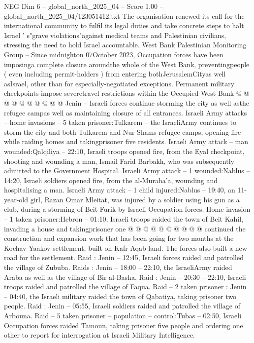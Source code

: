 \begin{textsample}{NEG Dim 6 – global\_north\_2025\_04 – Score 1.00 – global\_north\_2025\_04/123051412.txt}
The organisation renewed its call for the international community to fulfil its legal duties and take concrete steps to halt Israel ' s"grave violations"against medical teams and Palestinian civilians, stressing the need to hold Israel accountable.
West Bank Palestinian Monitoring Group -- Since midnighton 07October 2023, Occupation forces have been imposinga complete closure aroundthe whole of the West Bank, preventingpeople ( even including permit-holders ) from entering bothJerusalemCityas well asIsrael, other than for especially-negotiated exceptions.
Permanent military checkpoints impose severetravel restrictions within the Occupied West Bank @ @ @ @ @ @ @ @ @ @ Jenin -- Israeli forces continue storming the city as well asthe refugee campas well as maintaining closure of all entrances.
Israeli Army attacks -- home invasions -- 5 taken prisoner:Tulkarem -- the IsraeliArmy continues to storm the city and both Tulkarem and Nur Shams refugee camps, opening fire while raiding homes and takingprisoner five residents.
Israeli Army attack -- man wounded:Qalqiliya -- 22:10, Israeli troops opened fire, from the Eyal checkpoint, shooting and wounding a man, Ismail Farid Barbakh, who was subsequently admitted to the Government Hospital.
Israeli Army attack -- 1 wounded:Nablus -- 14:20, Israeli soldiers opened fire, from the al-Muraba'a, wounding and hospitalising a man.
Israeli Army attack -- 1 child injured:Nablus -- 19:40, an 11-year-old girl, Razan Omar Mleitat, was injured by a soldier using his gun as a club, during a storming of Beit Furik by Israeli Occupation forces.
Home invasion -- 1 taken prisoner:Hebron -- 01:10, Israeli troops raided the town of Beit Kahil, invading a house and takingprisoner one @ @ @ @ @ @ @ @ @ @ continued the construction and expansion work that has been going for two months at the Kochav Yaakov settlement, built on Kafr Aqab land.
The forces also built a new road for the settlement.
Raid : Jenin -- 12:45, Israeli forces raided and patrolled the village of Zububa.
Raids : Jenin -- 18:00 -- 22:10, the IsraeliArmy raided Araba as well as the village of Bir al-Basha.
Raid : Jenin -- 20:30 -- 22:10, Israeli troops raided and patrolled the village of Faqua.
Raid -- 2 taken prisoner : Jenin -- 04:40, the Israeli military raided the town of Qabatiya, taking prisoner two people.
Raid : Jenin -- 05:55, Israeli soldiers raided and patrolled the village of Arbouna.
Raid -- 5 taken prisoner -- population -- control:Tubas -- 02:50, Israeli Occupation forces raided Tamoun, taking prisoner five people and ordering one other to report for interrogation at Israeli Military Intelligence.

\end{textsample}
